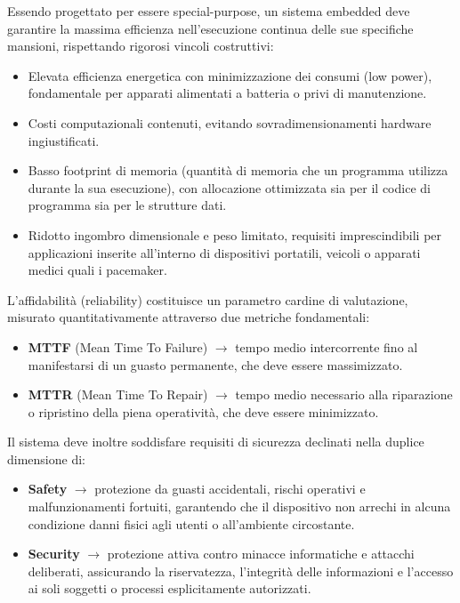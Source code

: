 Essendo progettato per essere special-purpose, un sistema embedded deve garantire la massima efficienza nell'esecuzione continua delle sue specifiche mansioni, rispettando rigorosi vincoli costruttivi:
\begin{itemize}
    \item Elevata efficienza energetica con minimizzazione dei consumi (low power), fondamentale per apparati alimentati a batteria o privi di manutenzione.
    \item Costi computazionali contenuti, evitando sovradimensionamenti hardware ingiustificati.
    \item Basso footprint di memoria (quantità di memoria che un programma utilizza durante la sua esecuzione), con allocazione ottimizzata sia per il codice di programma sia per le strutture dati.
    \item Ridotto ingombro dimensionale e peso limitato, requisiti imprescindibili per applicazioni inserite all'interno di dispositivi portatili, veicoli o apparati medici quali i pacemaker.
\end{itemize}

L'affidabilità (reliability) costituisce un parametro cardine di valutazione, misurato quantitativamente attraverso due metriche fondamentali:
\begin{itemize}
    \item \textbf{MTTF} (Mean Time To Failure) $\rightarrow$ tempo medio intercorrente fino al manifestarsi di un guasto permanente, che deve essere massimizzato.
    \item \textbf{MTTR} (Mean Time To Repair) $\rightarrow$ tempo medio necessario alla riparazione o ripristino della piena operatività, che deve essere minimizzato.
\end{itemize}

Il sistema deve inoltre soddisfare requisiti di sicurezza declinati nella duplice dimensione di:
\begin{itemize}
    \item \textbf{Safety} $\rightarrow$ protezione da guasti accidentali, rischi operativi e malfunzionamenti fortuiti, garantendo che il dispositivo non arrechi in alcuna condizione danni fisici agli utenti o all'ambiente circostante.
    \item \textbf{Security} $\rightarrow$ protezione attiva contro minacce informatiche e attacchi deliberati, assicurando la riservatezza, l'integrità delle informazioni e l'accesso ai soli soggetti o processi esplicitamente autorizzati.
\end{itemize}

